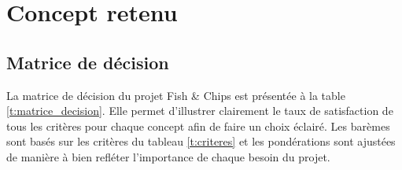 
%
%

\chapter{Concept retenu}
\label{s:concept_retenu}

\section{Matrice de décision}

La matrice de décision du projet Fish \& Chips est présentée à la table \ref{t:matrice_decision}. Elle permet d'illustrer clairement le taux de satisfaction de tous les critères pour chaque concept afin de faire un choix éclairé. Les barèmes sont basés sur les critères du tableau \ref{t:criteres} et les pondérations sont ajustées de manière à bien refléter l'importance de chaque besoin du projet. 

